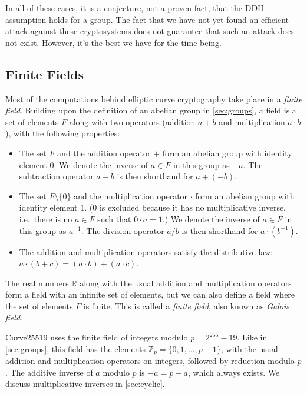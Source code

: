 \documentclass{article}
\begin{document}
In all of these cases, it is a conjecture, not a proven fact, that the DDH assumption holds for a group.
The fact that we have not yet found an efficient attack against these cryptosystems does not guarantee that such an attack does not exist.
However, it's the best we have for the time being.

\subsection{Finite Fields}\label{sec:fields}

Most of the computations behind elliptic curve cryptography take place in a \emph{finite field}.
Building upon the definition of an abelian group in \autoref{sec:groups}, a field is a set of elements $F$ along with two operators (addition $a + b$ and multiplication $a \cdot b$), with the following properties:
\begin{itemize}
    \item The set $F$ and the addition operator $+$ form an abelian group with identity element $0$.
        We denote the inverse of $a \in F$ in this group as $-a$.
        The subtraction operator $a - b$ is then shorthand for $a + (-b)$.
    \item The set $F \setminus \{0\}$ and the multiplication operator $\cdot$ form an abelian group with identity element $1$.
        (0 is excluded because it has no multiplicative inverse, i.e.\ there is no $a \in F$ such that $0 \cdot a = 1$.)
        We denote the inverse of $a \in F$ in this group as $a^{-1}$.
        The division operator $a/b$ is then shorthand for $a \cdot (b^{-1})$.
    \item The addition and multiplication operators satisfy the distributive law: $a \cdot (b + c) = (a \cdot b) + (a \cdot c)$.
\end{itemize}
The real numbers $\mathbb{R}$ along with the usual addition and multiplication operators form a field with an infinite set of elements, but we can also define a field where the set of elements $F$ is finite.
This is called a \emph{finite field}, also known as \emph{Galois field}.

Curve25519 uses the finite field of integers modulo $p = 2^{255}-19$.
Like in \autoref{sec:groups}, this field has the elements $\mathbb{Z}_p = \{0, 1, \dots, p-1\}$, with the usual addition and multiplication operators on integers, followed by reduction modulo $p$.
The additive inverse of $a$ modulo $p$ is $-a = p - a$, which always exists.
We discuss multiplicative inverses in \autoref{sec:cyclic}.
\end{document}
